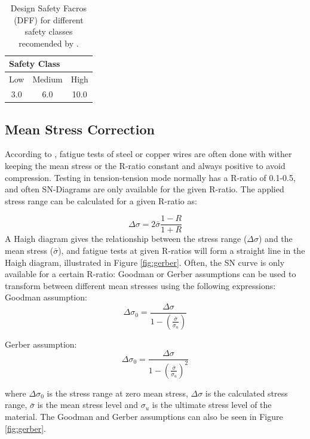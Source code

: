 \begin{table} [H]
\centering
\begin{tabular}{ |c|c|c|}
\hline
\multicolumn{3}{|l|}{\hspace{0.8cm}Safety Class}\\
 \hline
 \hline
Low & Medium & High \\
3.0 & 6.0 & 10.0\\
 \hline
\end{tabular}
\caption{Design Safety Facros (DFF) for different safety classes  recomended by \cite{riserfat}.}
\label{table:dff}
\end{table}
\subsection{Mean Stress Correction}
According to \cite{Savik2016}, fatigue tests of steel or copper wires are often done with wither keeping the mean stress or the R-ratio constant and always positive to avoid compression. Testing in tension-tension mode normally has a R-ratio of 0.1-0.5, and often SN-Diagrams are only available for the given R-ratio.  The applied stress range can be calculated for a given R-ratio as:

\begin{equation}
    \Delta \sigma = 2 \bar{\sigma} \frac{1-R}{1+R}
\end{equation}
A Haigh diagram gives the relationship between the stress range ($\Delta \sigma$) and the mean stress ($\bar{\sigma}$),  and fatigue tests at given R-ratios will form a straight line in the Haigh diagram, illustrated in Figure \ref{fig:gerber}. Often, the SN curve is only available for a certain R-ratio: Goodman or Gerber assumptions can be used to transform between different mean stresses using the following expressions:\newline
\newline
\noindent Goodman assumption:
\begin{equation}
    \Delta \sigma_0 = \frac{\Delta \sigma}{1-(\frac{\bar{\sigma}}{\sigma_u})}
\end{equation}

\noindent Gerber assumption:
\begin{equation}
    \Delta \sigma_0 = \frac{\Delta \sigma}{1-(\frac{\bar{\sigma}}{\sigma_u})^2}
\end{equation}

\noindent where $\Delta \sigma_0$ is the stress range at zero mean stress, $\Delta \sigma$ is the calculated stress range, $\bar{\sigma}$ is the mean stress level and $\sigma_u$ is the ultimate stress level of the material. The Goodman and Gerber assumptions can also be seen in Figure \ref{fig:gerber}. 

